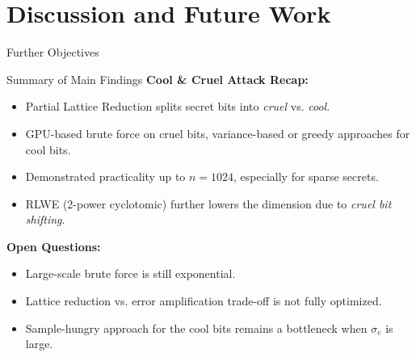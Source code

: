 \documentclass{beamer}
\begin{document}
\section{Discussion and Future Work}

\begin{frame}{}
    \Huge \centering
    Further Objectives
\end{frame}

\begin{frame}{Summary of Main Findings}
  \textbf{Cool \& Cruel Attack Recap:}
  \begin{itemize}
    \item Partial Lattice Reduction splits secret bits into \textit{cruel} vs. \textit{cool}.
    \item GPU-based brute force on cruel bits, variance-based or greedy approaches for cool bits.
    \item Demonstrated practicality up to $n=1024$, especially for sparse secrets.
    \item RLWE (2-power cyclotomic) further lowers the dimension due to \emph{cruel bit shifting}.
  \end{itemize}

  \vspace{0.3cm}
  \textbf{Open Questions:}
  \begin{itemize}
    \item Large-scale brute force is still exponential.
    \item Lattice reduction vs. error amplification trade-off is not fully optimized.
    \item Sample-hungry approach for the cool bits remains a bottleneck when $\sigma_e$ is large.
  \end{itemize}
\end{frame}
\end{document}
